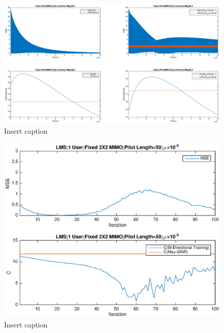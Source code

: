 \documentclass[11pt, oneside]{article}   	%
\begin{document}
\begin{figure}[bp!]
    \centering
    \centerline{\includegraphics[width=220mm]{1USER_4X4MIMO}}
    \caption{Insert caption}
\end{figure} 

\begin{figure}[bp!]
    \centering
    \centerline{\includegraphics[width=220mm]{LMS1}}
    \caption{Insert caption}
\end{figure} 
\end{document}
